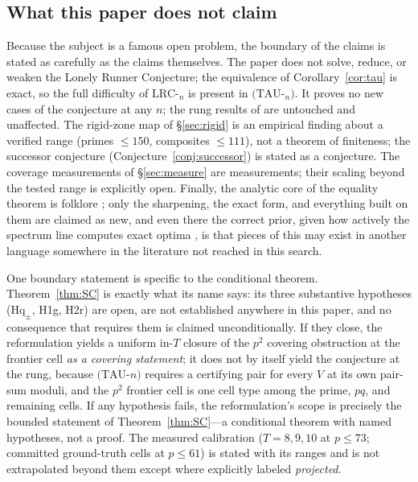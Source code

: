 \subsection{What this paper does not claim}

Because the subject is a famous open problem, the boundary of the claims
is stated as carefully as the claims themselves. The paper does not solve,
reduce, or weaken the Lonely Runner Conjecture; the equivalence of
Corollary~\ref{cor:tau} is exact, so the full difficulty of
$\mathrm{LRC}$-$_n$ is present in $(\mathrm{TAU}$-$_n)$. It proves no new
cases of the conjecture at any $n$; the rung results of
\cite{Rosenfeld8,Trakulthongchai,Sungkawichai,Allikvere} are untouched and
unaffected. The rigid-zone map of \S\ref{sec:rigid} is an empirical
finding about a verified range (primes $\le 150$, composites $\le 111$),
not a theorem of finiteness; the successor conjecture
(Conjecture~\ref{conj:successor}) is stated as a conjecture. The coverage
measurements of \S\ref{sec:measure} are measurements; their scaling
beyond the tested range is explicitly open. Finally, the analytic core of
the equality theorem is folklore \cite{Tao-blog}; only the sharpening, the
exact form, and everything built on them are claimed as new, and even
there the correct prior, given how actively the spectrum line computes
exact optima \cite{Cordella}, is that pieces of this may exist in another
language somewhere in the literature not reached in this search.

One boundary statement is specific to the conditional theorem.
Theorem~\ref{thm:SC} is exactly what its name says: its three substantive
hypotheses ($\mathrm{Hq}_\pm$, H1g, H2r) are open, are not established
anywhere in this paper, and no consequence that requires them is claimed
unconditionally. If they close, the reformulation yields a uniform
in-$T$ closure of the $p^2$ covering obstruction at the frontier cell
\emph{as a covering statement}; it does not by itself yield the
conjecture at the rung, because $(\mathrm{TAU}$-$n)$ requires a certifying
pair for every $V$ at its own pair-sum moduli, and the $p^2$ frontier
cell is one cell type among the prime, $pq$, and remaining cells. If any
hypothesis fails, the reformulation's scope is precisely the bounded
statement of Theorem~\ref{thm:SC}---a conditional theorem with named
hypotheses, not a proof. The measured calibration ($T=8,9,10$ at $p\le73$; committed
ground-truth cells at $p\le61$) is stated with its ranges and is not
extrapolated beyond them except where explicitly labeled
\emph{projected}.

